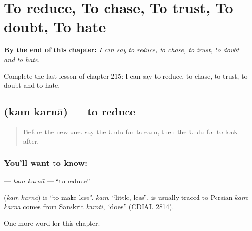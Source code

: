 
\chapter{To reduce, To chase, To trust, To doubt, To hate}
\label{ch:ur-to-reduce-to-chase-to-trust-to-doubt-to-hate}

\begin{chapteropening}
\textbf{By the end of this chapter:} \emph{I can say to reduce, to chase, to trust, to doubt and to hate.}

Complete the last lesson of chapter 215: I can say to reduce, to chase, to trust, to doubt and to hate.
\end{chapteropening}

\section[\texorpdfstring{\ur{کم} \ur{کرنا} (kam karnā)}{کم کرنا (kam karnā)}]{  (kam karnā) — to reduce}

\label{lesson:UR-C215-kam-karna}



\begin{quote}
Before the new one: say the Urdu for to earn, then the Urdu for to look after.
\end{quote}

\subsection*{You'll want to know:  }
\textbf{ } — \emph{kam karnā} — \textquotedblleft{}to reduce\textquotedblright{}.

\begin{cousinweb}
\textbf{ } (\emph{kam karnā}) is \textquotedblleft{}to make less\textquotedblright{}. \emph{kam}, \textquotedblleft{}little, less\textquotedblright{}, is usually traced to Persian \emph{kam}; \emph{karnā} comes from Sanskrit \emph{karoti}, \textquotedblleft{}does\textquotedblright{} (CDIAL 2814).
\end{cousinweb}

\begin{grammarlens}[title={What you've built}]
One more word for this chapter.
\end{grammarlens}

